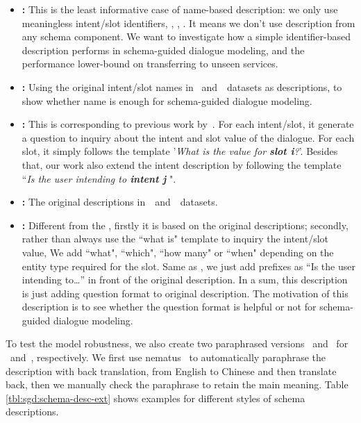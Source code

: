 \begin{itemize}
\item \textbf{\ID:} This is the least informative case of name-based
description: we only use meaningless intent/slot identifiers,
\eg, , . It means we don't use description from any
schema component. We want to investigate how a simple identifier-based
description performs in schema-guided dialogue modeling, and the
performance lower-bound on transferring to unseen services.

\item \textbf{\NAMEONLY:} Using the original intent/slot names in~\sgdst
and~\multiwoz~datasets as descriptions, to show whether name is enough
for schema-guided dialogue modeling.

\item \textbf{\QANAMEONLY:} This is corresponding to previous
  work by~\citet{gao2019dialog}. For each intent/slot, it generate a
  question to inquiry about the intent and slot value of the
  dialogue. For each slot, it simply follows the template '{\it What
    is the value for {\bf slot i}?}'. Besides that, our work also
  extend the intent description by following the template ``{\it Is
    the user intending to {\bf intent j} }".

 \item \textbf{\ORIGIN:} The original descriptions in~\sgdst~and~\multiwoz~datasets.

 \item \textbf{\QARICH:} Different from the \QANAMEONLY, firstly it is
  based on the original descriptions; secondly, rather than always use
  the ``what is" template to inquiry the intent/slot value, We add
  ``what", ``which", ``how many" or ``when" depending on the entity
  type required for the slot.  Same as \QANAMEONLY, we just add
  prefixes as ``Is the user intending to\ldots'' in front of the original
  description. In a sum, this description is just adding question
  format to original description. The motivation of this description is
  to see whether the question format is helpful or not for
  schema-guided dialogue modeling.

\end{itemize}

To test the model robustness, we also create two paraphrased
  versions \textbf{\NAMEPARA}~and \textbf{\PARAPHRASE}~for
  \NAMEONLY~and~\ORIGIN, respectively. We first use
  nematus~\citep{sennrich-etal-2017-nematus} to automatically
  paraphrase the description with back translation, from English to
  Chinese and then translate back, then we manually check the
  paraphrase to retain the main meaning. Table
  \ref{tbl:sgd:schema-desc-ext} shows examples for different styles of
  schema descriptions.

